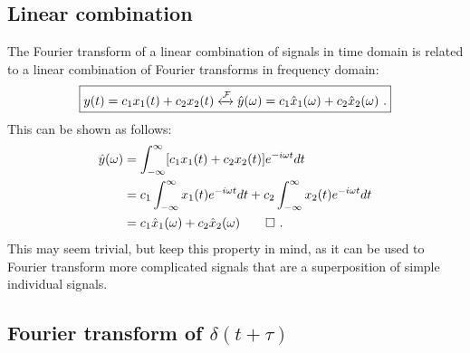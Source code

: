 \subsection{Linear combination}
The Fourier transform of a linear combination of signals in time domain is related to a 
linear combination of Fourier transforms in frequency domain:
\begin{equation}
    \boxed{
        y(t)=c_1 x_1(t)  + c_2 x_2(t) \xleftrightarrow{\mathcal{F}} \hat{y}(\omega) = c_1\hat{x}_1(\omega)+c_2\hat{x}_2(\omega)\,\,.
    }
\end{equation}
This can be shown as follows:
\begin{align}
    \hat{y}(\omega) & = \int_{-\infty}^{\infty} [c_1 x_1(t)+c_2 x_2(t)] e^{-i\omega t} dt                                         \\
                    & = c_1\int_{-\infty}^{\infty} x_1(t) e^{-i\omega t} dt + c_2\int_{-\infty}^{\infty} x_2(t) e^{-i\omega t} dt \\
                    & =  c_1\hat{x}_1(\omega)+c_2\hat{x}_2(\omega)\qed\,\,.
\end{align}
This may seem trivial, but keep this property in mind, as it can be used to Fourier 
transform more complicated signals that are a superposition of simple individual signals.

\subsection{Fourier transform of $\delta(t+\tau)$}

